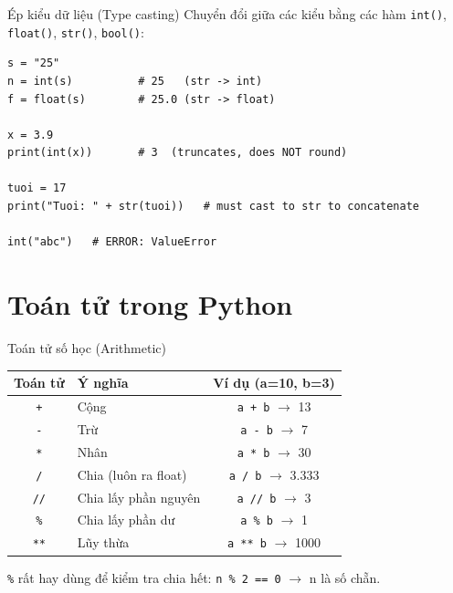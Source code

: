 \documentclass[11pt]{beamer}
\begin{document}
\begin{frame}[fragile]{Ép kiểu dữ liệu (Type casting)}
Chuyển đổi giữa các kiểu bằng các hàm \texttt{int()}, \texttt{float()}, \texttt{str()}, \texttt{bool()}:
\begin{lstlisting}
s = "25"
n = int(s)          # 25   (str -> int)
f = float(s)        # 25.0 (str -> float)

x = 3.9
print(int(x))       # 3  (truncates, does NOT round)

tuoi = 17
print("Tuoi: " + str(tuoi))   # must cast to str to concatenate

int("abc")   # ERROR: ValueError
\end{lstlisting}
\end{frame}

\section{Toán tử trong Python}

\begin{frame}[fragile]{Toán tử số học (Arithmetic)}
\begin{center}
\begin{tabular}{|c|l|c|}
\hline
\textbf{Toán tử} & \textbf{Ý nghĩa} & \textbf{Ví dụ (a=10, b=3)} \\
\hline
\texttt{+}  & Cộng                  & \texttt{a + b} $\to$ 13 \\
\texttt{-}  & Trừ                   & \texttt{a - b} $\to$ 7 \\
\texttt{*}  & Nhân                  & \texttt{a * b} $\to$ 30 \\
\texttt{/}  & Chia (luôn ra float)  & \texttt{a / b} $\to$ 3.333 \\
\texttt{//} & Chia lấy phần nguyên  & \texttt{a // b} $\to$ 3 \\
\texttt{\%} & Chia lấy phần dư      & \texttt{a \% b} $\to$ 1 \\
\texttt{**} & Lũy thừa              & \texttt{a ** b} $\to$ 1000 \\
\hline
\end{tabular}
\end{center}
\vspace{0.2cm}
\small \texttt{\%} rất hay dùng để kiểm tra chia hết: \texttt{n \% 2 == 0} $\to$ n là số chẵn.
\end{frame}
\end{document}
